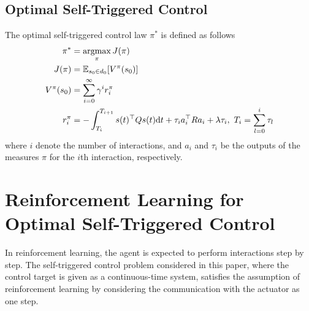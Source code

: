 \documentclass[english, dvipdfmx]{ampmt}             %
\newcommand{\argmax}{\mathop{\rm argmax}\limits}
\newcommand{\expect}{\mathbb{E}}
\begin{document}
\subsection{Optimal Self-Triggered Control}
The optimal self-triggered control law $\pi^{*}$ is defined as follows
\begin{align}
	\pi^{*} &= \argmax_{\pi}J(\pi) \label{optimal_policy}\\
	J(\pi) &= \expect_{s_0\in d_0}[V^{\pi}(s_0)] \\
	V^{\pi}(s_0) &= \sum_{i=0}^{\infty} \gamma^i r^{\pi}_i \label{value} \\
	r^{\pi}_i &= -\int_{T_i}^{T_{i+1}}s(t)^{\top}Qs(t)\textrm{d}t +\tau_ia_i^{\top}Ra_i + \lambda \tau_i, ~T_i = \sum_{l=0}^{i} \tau_l \label{reward}
\end{align}
where $i$ denote the number of interactions, and $a_i$ and $\tau_i$ be the outputs of the measures $\pi$ for the $i$th interaction, respectively. \par

\section{Reinforcement Learning for Optimal Self-Triggered Control}
In reinforcement learning, the agent is expected to perform interactions step by step. The self-triggered control problem considered in this paper, where the control target is given as a continuous-time system, satisfies the assumption of reinforcement learning by considering the communication with the actuator as one step.\par
\end{document}
